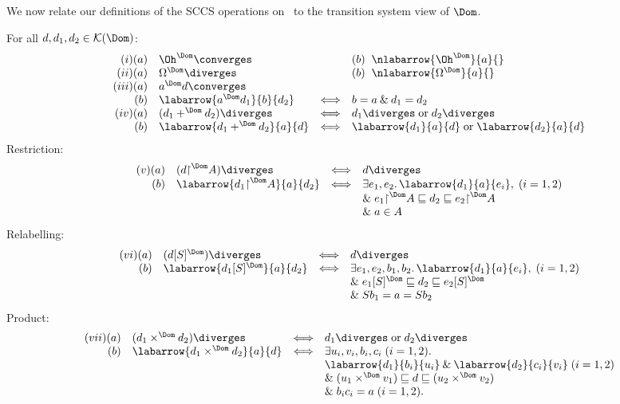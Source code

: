 We now relate our definitions of the SCCS operations on \Dom\ to the transition system view of $\Dom$.
\begin{proposition}
\label{dops}
For all $d, d_{1}, d_{2} \in {\cal K}(\Dom )$:
\[ \begin{array}{rlcl}
(i) (a) & \Oh^{\Dom} \converges & &  (b) \;\; \nlabarrow{\Oh^{\Dom}}{a}{} \\
(ii) (a) & \Omega^{\Dom} \diverges & & (b) \;\; \nlabarrow{\Omega^{\Dom}}{a}{} \\
(iii) (a) & a^{\Dom} d \converges & & \\
(b) & \labarrow{a^{\Dom} d_{1}}{b}{d_{2}} & \Longleftrightarrow & b = a \: \& \: d_{1} = d_{2} \\
(iv) (a) & (d_{1} +^{\Dom} d_{2}) \diverges & \Longleftrightarrow & d_{1} \diverges \; \mbox{or} \; d_{2} \diverges \\
(b) & \labarrow{d_{1} +^{\Dom} d_{2}}{a}{d} & \Longleftrightarrow & \labarrow{d_{1}}{a}{d} \; \mbox{or} \; \labarrow{d_{2}}{a}{d} \\
\end{array} \]
Restriction:
\[ \begin{array}{rlcl}
(v) (a) & (d {\restriction}^{\Dom} A) \diverges & \Longleftrightarrow & d \diverges \\
(b) & \labarrow{d_{1} {\restriction}^{\Dom} A}{a}{d_{2}} & \Longleftrightarrow & \exists e_{1}, e_{2} . \, \labarrow{d_{1}}{a}{e_{i}}, \; (i = 1, 2) \\
& & & \mbox{} \& \; e_{1} {\restriction}^{\Dom} A \sqsubseteq d_{2} \sqsubseteq e_{2} {\restriction}^{\Dom} A \\
& & &  \& \; a \in A 
\end{array} \]
Relabelling:
\[ \begin{array}{rlcl}
(vi) (a) & (d [S]^{\Dom}) \diverges & \Longleftrightarrow & d \diverges \\
(b) & \labarrow{d_{1} [S]^{\Dom}}{a}{d_{2}} & \Longleftrightarrow & \exists e_{1}, e_{2}, b_{1}, b_{2} . \, \labarrow{d_{1}}{a}{e_{i}}, \; (i = 1, 2) \\
& & & \mbox{} \& \; e_{1} [S]^{\Dom} \sqsubseteq d_{2} \sqsubseteq e_{2} [S]^{\Dom} \\
& & &  \& \; S b_{1} = a = S b_{2} 
\end{array} \]
Product:
\[ \begin{array}{rlcl}
(vii) (a) & (d_{1} \times^{\Dom} d_{2}) \diverges & \Longleftrightarrow & d_{1} \diverges \; \mbox{or} \; d_{2} \diverges \\
(b) & \labarrow{d_{1} \times^{\Dom} d_{2}}{a}{d} & \Longleftrightarrow & \exists u_{i}, v_{i}, b_{i}, c_{i} \; (i = 1, 2). \\
& & & \labarrow{d_{1}}{b_{i}}{u_{i}} \: \& \: \labarrow{d_{2}}{c_{i}}{v_{i}} \; (i = 1, 2) \\
& & & \mbox{} \& \; (u_{1} \times^{\Dom} v_{1}) \sqsubseteq d \sqsubseteq (u_{2} \times^{\Dom} v_{2}) \\
& & &  \& \; b_{i}c_{i} = a \; (i = 1, 2).
\end{array} \]
\end{proposition}

